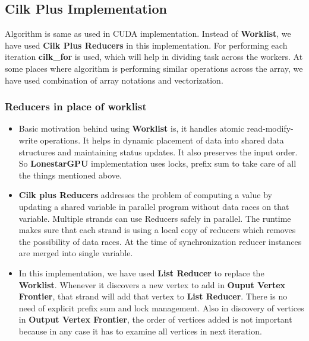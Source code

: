 \documentclass{article}
\begin{document}
\subsection{Cilk Plus Implementation}

Algorithm is same as used in CUDA implementation. Instead of \textbf{Worklist}, we have used \textbf{Cilk Plus Reducers} in this implementation. For performing each iteration \textbf{cilk\_for} is used, which will help in dividing task across the workers. At some places where algorithm is performing similar operations across the array, we have used combination of array notations and vectorization. \\ 

\subsubsection{Reducers in place of worklist} 

\begin{itemize}
\item Basic motivation behind using \textbf{Worklist} is, it handles atomic read-modify-write operations. It helps in dynamic placement of data into shared data structures and maintaining status updates. It also preserves the input order. So \textbf{LonestarGPU} implementation uses locks, prefix sum to take care of all the things mentioned above. \\
\item \textbf{Cilk plus Reducers} addresses the problem of computing a value by updating a shared variable in parallel program without data races on that variable. Multiple strands can use Reducers safely in parallel. The runtime makes sure that each strand is using a local copy of reducers which removes the possibility of data races. At the time of synchronization reducer instances are merged into single variable. \\
\item In this implementation, we have used \textbf{List Reducer} to replace the \textbf{Worklist}. Whenever it discovers a new vertex to add in \textbf{Ouput Vertex Frontier}, that strand will add that vertex to \textbf{List Reducer}. There is no need of explicit prefix sum and lock management. Also in discovery of vertices in \textbf{Output Vertex Frontier}, the order of vertices added is not important because in any case it has to examine all vertices in next iteration. \\
\end{itemize}
\end{document}
